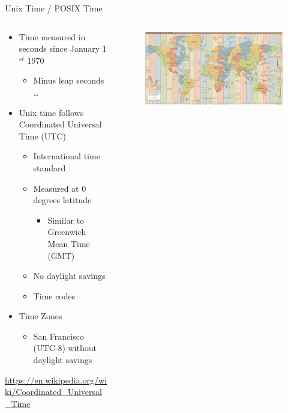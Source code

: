 \documentclass[aspectratio=169]{../latex_main/tntbeamer}  %
\begin{document}
	
	\begin{frame}{Unix Time / POSIX Time}
	    \begin{columns}
	    \begin{column}{.7\textwidth}
	    
	  
	    
	    \begin{itemize}
	        \item Time measured in seconds since January 1$^{st}$ 1970
	        \begin{itemize}
	            \item Minus leap seconds …
	        \end{itemize}
	        \item Unix time follows Coordinated Universal Time (UTC)
	        \begin{itemize}
	            \item International time standard 
	            \item Measured at 0 degrees latitude
	            \begin{itemize}
	                \item Similar to Greenwich Mean Time (GMT)
	            \end{itemize}
	            \item No daylight savings 
	            \item Time codes 
	        \end{itemize}
	        \item Time Zones
	        \begin{itemize}
	            \item San Francisco (UTC-8) without daylight savings
	        \end{itemize}
	    \end{itemize}
	    \bigskip
	    \url{https://en.wikipedia.org/wiki/Coordinated_Universal_Time}
	      \end{column}
	      
	      
	      \begin{column}{.3\textwidth}
	              \begin{figure}
	                  \includegraphics[scale=.45]{Bild19}
	              \end{figure}
	      \end{column}
	    \end{columns}
	\end{frame}
\end{document}
